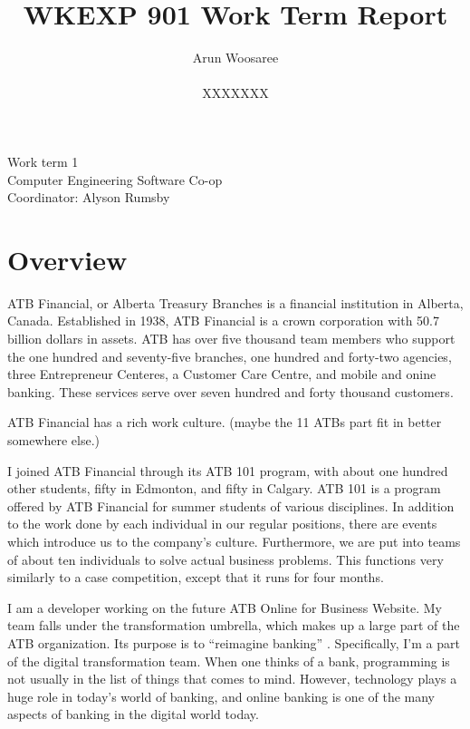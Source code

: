 \documentclass[letterpaper,12pt]{article}
\title{WKEXP 901 Work Term Report}
\author{Arun Woosaree \\ \\  XXXXXXX}
\begin{document}
\begin{titlepage}
 \maketitle
 \thispagestyle{empty}
 \centering
 \large
 \vspace{1cm}
 Work term 1\\
 \vspace{1cm}
 Computer Engineering Software Co-op \\
 \vspace{1cm}
 Coordinator: Alyson Rumsby
\end{titlepage}

\section{Overview}

ATB Financial, or Alberta Treasury Branches is a financial institution in Alberta, Canada.
Established in 1938, ATB Financial is a crown corporation with 50.7 billion dollars in assets.\cite{annualreport2018}
ATB has over five thousand team members who support the one hundred and seventy-five branches, one hundred and forty-two
agencies, three Entrepreneur Centeres, a Customer Care Centre, and mobile and onine banking.
These services serve over seven hundred and forty thousand customers. \cite{annualreport2018, annualreport2017}

ATB Financial has a rich work culture. (maybe the 11 ATBs part fit in better somewhere else.)

I joined ATB Financial through its ATB 101 program, with about one hundred other students,
fifty in Edmonton, and fifty in Calgary. ATB 101 is a program offered by ATB Financial
for summer students of various disciplines. In addition to the work done by each individual
in our regular positions, there are events which introduce us to the company's culture.
Furthermore, we are put into teams of about ten individuals to solve actual business problems.
This functions very similarly to a case competition, except that it runs for four months.

I am a developer working on the future ATB Online for Business Website. My team falls under the
transformation umbrella, which
makes up a large part of the ATB organization. Its purpose is to ``reimagine banking'' \cite{atbstory}.
Specifically, I'm a part of the digital transformation team. When one thinks of a bank,
programming is not usually in the list of things that comes to mind. However, technology
plays a huge role in today's world of banking, and online banking is one of the many
aspects of banking in the digital world today.
\end{document}
